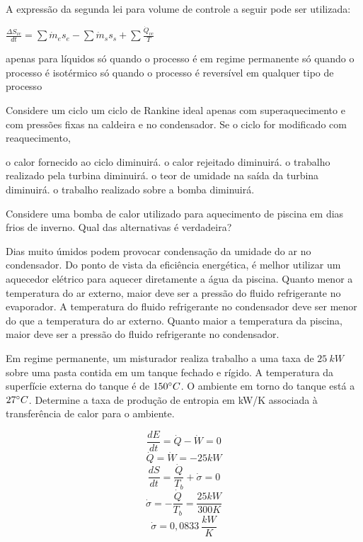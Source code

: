 \documentclass[answers]{exam}
\begin{document}
\begin{questions}
  \question A expressão da segunda lei para volume de controle a seguir pode ser utilizada:

  $\frac{\Delta S_{vc}}{dt} = \sum \dot m_e s_e - \sum \dot m_s s_s + \sum \frac{\dot Q_{vc}}{T}$
  \begin{checkboxes}
    \choice apenas para líquidos
    \choice só quando o processo é em regime permanente
    \choice só quando o processo é isotérmico
    \CorrectChoice só quando o processo é reversível
    \choice em qualquer tipo de processo
  \end{checkboxes}



  \question Considere um ciclo um ciclo de Rankine ideal apenas com superaquecimento e com pressões fixas na caldeira e no condensador. Se o ciclo for modificado com reaquecimento,
  \begin{checkboxes}
    \choice o calor fornecido ao ciclo diminuirá.
    \choice o calor rejeitado diminuirá.
    \choice o trabalho realizado pela turbina diminuirá.
    \CorrectChoice o teor de umidade na saída da turbina diminuirá.
    \choice o trabalho realizado sobre a bomba diminuirá.
  \end{checkboxes}



  \question Considere uma bomba de calor utilizado para aquecimento de piscina em dias frios de inverno. Qual das alternativas é verdadeira?
  \begin{checkboxes}
    \choice Dias muito úmidos podem provocar condensação da umidade do ar no condensador.
    \choice Do ponto de vista da eficiência energética, é melhor utilizar um aquecedor elétrico para aquecer diretamente a água da piscina.
    \choice Quanto menor a temperatura do ar externo, maior deve ser a pressão do fluido refrigerante no evaporador.
    \choice A temperatura do fluido refrigerante no condensador deve ser menor do que a temperatura do ar externo.
    \CorrectChoice Quanto maior a temperatura da piscina, maior deve ser a pressão do fluido refrigerante no condensador.
  \end{checkboxes}



  \question Em regime permanente, um misturador realiza trabalho a uma taxa de $25\ kW$ sobre uma pasta contida em um tanque fechado e rígido. A temperatura da superfície externa do tanque é de $150\degree C$. O ambiente em torno do tanque está a $27\degree C$. Determine a taxa de produção de entropia em kW/K associada à transferência de calor para o ambiente.
  \begin{solution}
    \begin{multicols}{2}
      $$\frac{dE}{dt} = \dot Q - \dot W = 0$$
      $$\dot Q = \dot W = -25 kW$$
      $$\frac{dS}{dt} = \frac{\dot Q}{T_b} + \dot\sigma = 0$$
      $$\dot\sigma = -\frac{\dot Q}{T_b} = \frac{25 kW}{300 K}$$
      $$\dot\sigma = 0,0833\ \frac{kW}{K}$$
    \end{multicols}
  \end{solution}




\end{questions}
\end{document}
